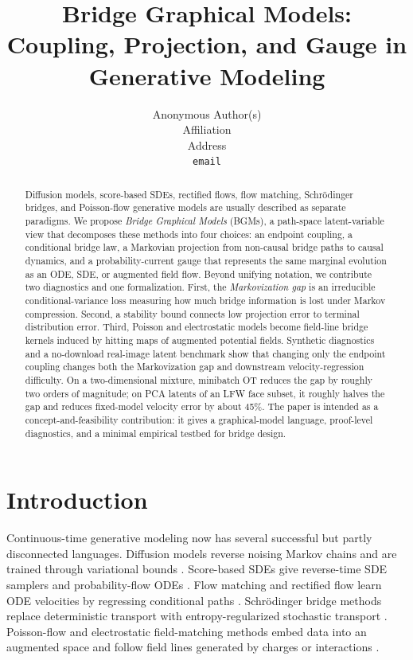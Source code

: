 \documentclass{article}
\title{Bridge Graphical Models: Coupling, Projection, and Gauge in Generative Modeling}
\author{Anonymous Author(s)\\Affiliation\\Address\\\texttt{email}}
\numberwithin{equation}{section}
\begin{document}
\maketitle

\begin{abstract}
Diffusion models, score-based SDEs, rectified flows, flow matching, Schr\"odinger bridges, and Poisson-flow generative models are usually described as separate paradigms. We propose \emph{Bridge Graphical Models} (BGMs), a path-space latent-variable view that decomposes these methods into four choices: an endpoint coupling, a conditional bridge law, a Markovian projection from non-causal bridge paths to causal dynamics, and a probability-current gauge that represents the same marginal evolution as an ODE, SDE, or augmented field flow. Beyond unifying notation, we contribute two diagnostics and one formalization. First, the \emph{Markovization gap} is an irreducible conditional-variance loss measuring how much bridge information is lost under Markov compression. Second, a stability bound connects low projection error to terminal distribution error. Third, Poisson and electrostatic models become field-line bridge kernels induced by hitting maps of augmented potential fields. Synthetic diagnostics and a no-download real-image latent benchmark show that changing only the endpoint coupling changes both the Markovization gap and downstream velocity-regression difficulty. On a two-dimensional mixture, minibatch OT reduces the gap by roughly two orders of magnitude; on PCA latents of an LFW face subset, it roughly halves the gap and reduces fixed-model velocity error by about 45\%. The paper is intended as a concept-and-feasibility contribution: it gives a graphical-model language, proof-level diagnostics, and a minimal empirical testbed for bridge design.
\end{abstract}

\section{Introduction}

Continuous-time generative modeling now has several successful but partly disconnected languages. Diffusion models reverse noising Markov chains and are trained through variational bounds \citep{sohldickstein2015nonequilibrium,ho2020ddpm,kingma2021vdm}. Score-based SDEs give reverse-time SDE samplers and probability-flow ODEs \citep{song2021score}. Flow matching and rectified flow learn ODE velocities by regressing conditional paths \citep{lipman2023flow,liu2022rectified,tong2024cfm}. Schr\"odinger bridge methods replace deterministic transport with entropy-regularized stochastic transport \citep{tong2024sf2m,shi2023dsbm}. Poisson-flow and electrostatic field-matching methods embed data into an augmented space and follow field lines generated by charges or interactions \citep{xu2022pfgm,xu2023pfgmpp,kolesov2025field,manukhov2025ifm,shlenskii2026duality}.
\end{document}
